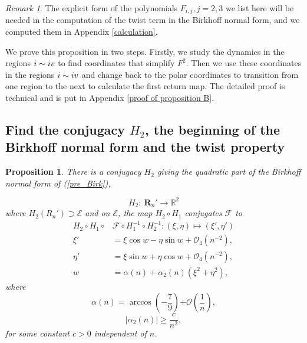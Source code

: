 \documentclass{article}
\def \Rone{\uppercase\expandafter{\romannumeral1}}
\def \Rfour{\uppercase\expandafter{\romannumeral4}}
\numberwithin{figure}{section}
\numberwithin{equation}{section}
\newtheorem{main}{Proposition}
\theoremstyle{remark}
\newtheorem*{remark}{Remark}
\theoremstyle{definition}
\begin{document}
\begin{remark}
	The explicit form of the polynomials $F_{i,j},j=2,3$ we list here will be needed in the computation of the twist term in the Birkhoff normal form, and we computed them in Appendix \ref{calculation}.
\end{remark}

We prove this proposition in two steps. Firstly, we study the dynamics in the regions $\Rone\sim\Rfour$ to find coordinates that simplify $F^2$. Then we use these coordinates in the regions $\Rone\sim\Rfour$ and change back to the polar coordinates to transition from one region to the next to calculate the first return map. The detailed proof is technical and is put in Appendix \ref{proof of proposition B}.



\subsection{Find the conjugacy \texorpdfstring{$H_2$}{TEXT}, the beginning of the Birkhoff normal form and the twist property}\label{find H2}
\begin{main}\label{FindBirk}
There is a conjugacy \(H_{2}\) giving the quadratic part
of the Birkhoff normal
form of \emph{(}\ref{pre_Birk}\emph{)},

$$H_2:\ \mathbf{R}_n' \rightarrow \mathbb{R}^2$$
where  $H_2\left(R_n'\right)\supset {\mathcal{E}}$ 
and on ${\mathcal{E}}$, the map \(H_2\circ H_1\) conjugates \(\mathcal{F}\)
to
\begin{equation*}
	\begin{split}
	    H_2\circ H_1\circ &\mathcal{F}\circ H_1^{-1}\circ H_2^{-1}:\left( \xi,\eta\right) \mapsto \left( \xi',\eta' \right)\\
		\xi' &= \xi\cos w - \eta\sin w + \mathcal{O}_{4}\left({n^{-2}}\right),\\
		\eta' &= \xi\sin w + \eta\cos w +\mathcal{O}_{4}\left({n^{-2}}\right),\\
		w &= \alpha(n) + \alpha_{2}(n)\left( \xi^{2} + \eta^{2} \right),
	\end{split}
\end{equation*}
where
\[\alpha(n) = \arccos\left( - \frac{7}{9} \right)\mathcal{+ O}\left( \frac{1}{n} \right),\]
\[|\alpha_{2}(n)| \geq \frac{c}{n^{2}},\]
for some constant \(c > 0\) independent of \(n\).
\end{main}
\end{document}
